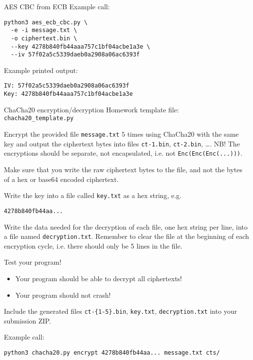 \documentclass{homework}
\begin{document}
\begin{task}{AES CBC from ECB}
  Example call:%
  \begin{Verbatim}
python3 aes_ecb_cbc.py \ 
  -e -i message.txt \
  -o ciphertext.bin \
  --key 4278b840fb44aaa757c1bf04acbe1a3e \
  --iv 57f02a5c5339daeb0a2908a06ac6393f
  \end{Verbatim}

  Example printed output:%
  \begin{Verbatim}
IV: 57f02a5c5339daeb0a2908a06ac6393f
Key: 4278b840fb44aaa757c1bf04acbe1a3e
  \end{Verbatim}
\end{task}




\begin{task}{ChaCha20 encryption/decryption}
  Homework template file: \texttt{chacha20\_template.py}

  Encrypt the provided file \texttt{message.txt} $5$ times using ChaCha20 with the same key and output the ciphertext bytes into files \texttt{ct-1.bin}, \texttt{ct-2.bin}, \dots.
  NB! The encryptions should be separate, not encapsulated, i.e. not \texttt{Enc(Enc(Enc(...)))}.

  \begin{tcolorbox}[title=Note]
    Make sure that you write the raw ciphertext bytes to the file, and not the bytes of a hex or base64 encoded ciphertext.
  \end{tcolorbox}

  Write the key into a file called \texttt{key.txt} as a hex string, e.g.
  \begin{tcolorbox}[title={\texttt{key.txt}}]
    \texttt{4278b840fb44aa...}
  \end{tcolorbox}

  Write the data needed for the decryption of each file, one hex string per line, into a file named \texttt{decryption.txt}.
  Remember to clear the file at the beginning of each encryption cycle, i.e. there should only be 5 lines in the file.

  Test your program!
  \begin{itemize}
    \item Your program should be able to decrypt all ciphertexts!
    \item Your program should not crash!
  \end{itemize}

  Include the generated files \texttt{ct-\{1-5\}.bin}, \texttt{key.txt}, \texttt{decryption.txt} into your submission ZIP.

  Example call:%
  \begin{Verbatim}
python3 chacha20.py encrypt 4278b840fb44aa... message.txt cts/
  \end{Verbatim}
\end{task}
\end{document}

